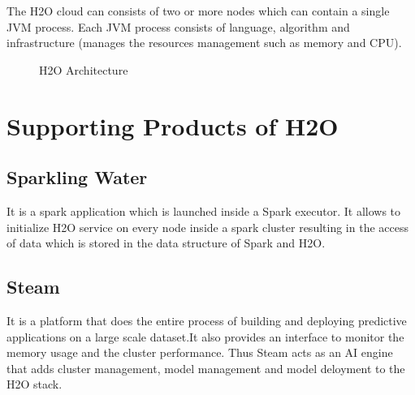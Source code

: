 \documentclass[9pt,twocolumn,twoside]{../../styles/osajnl}
\begin{document}
The H2O cloud can consists of two or more nodes
which can contain a single JVM process. Each JVM process consists of
language, algorithm and infrastructure (manages the resources
management such as memory and CPU)\cite{www-h2o-architecture}.

\begin{figure}[htbp]
\centering
{}
\caption{H2O Architecture\cite{www-h2o-architecture}}
\label{ fig:Architecture of H2O}
\end{figure}

\section{Supporting Products of H2O}

\subsection{Sparkling Water}
It is a spark application which is launched inside a Spark executor. It allows to initialize H2O service on every node inside a spark cluster resulting in the access of data which is stored in the data structure of Spark and H2O\cite{www-h2o-spark}.

\subsection{Steam}
It is a platform that does the entire process of building and deploying predictive applications on a large scale dataset.It also provides an interface to monitor the memory usage and the cluster performance\cite{www-h2o-steamgithub}. Thus Steam acts as an AI engine that adds cluster management, model management and model deloyment to the H2O stack\cite{www-h2o-steam}.
\end{document}
